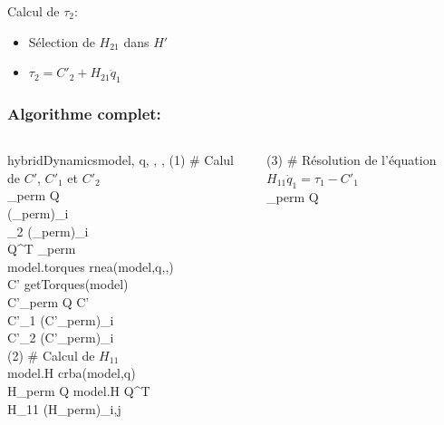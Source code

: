 \documentclass[10pt]{beamer}
\begin{document}
\begin{frame}[allowframebreaks]
	\framebreak
	
	Calcul de $\tau_2$:
	\begin{itemize}
	\item Sélection de $H_{21}$ dans  $H'$
	\item $\tau_2 = C'_2 + H_{21} \ddot{q}_1$
	\end{itemize} \vfill
	
\end{frame}
	
\begin{frame}
	\frametitle{Algorithme complet:}
	  
	\begin{spacing}{1.5}
	\begin{columns}[T]\scriptsize
	\begin{column}{.48\textwidth}
	\begin{pseudocode}{hybridDynamics}{model, q, , , \tau}
	(1)
	\BEGIN
	  \textnormal{\# Calul de $C'$, $C'_1$ et $C'_2$} \\
	  _{perm} \GETS Q  \\
	  (_{perm})_{i \in [1,fd]}  \\
	  _2 \GETS (_{perm})_{i \in [fd+1,n_{dof}]} \\
	   \GETS Q^T _{perm} \\
	  model.torques \GETS rnea(model,q,,) \\
	  C' \GETS getTorques(model) \\
	  C'_{perm} \GETS Q C'\\
	  C'_1 \GETS (C'_{perm})_{i \in [1,fd]} \\
	  C'_2 \GETS (C'_{perm})_{i \in [fd+1,n_{dof}]}
	\END \\
	(2)
	\BEGIN
	  \textnormal{\# Calcul de $H_{11}$} \\
	  model.H \GETS crba(model,q) \\
	  H_{perm} \GETS Q model.H Q^T \\
	  H_{11} \GETS (H_{perm})_{i,j \in [1,fd]} 
	\END 
	\end{pseudocode}
	\end{column}
	\begin{column}{.48\textwidth}
	\begin{pseudocode}{ }{ }
	(3) 
	\BEGIN
	  \textnormal{\# Résolution de l'équation $H_{11} \ddot{q}_1 = \tau_1 - C'_1$} \\
	  \tau_{perm} \GETS Q \tau \\

\end{pseudocode}
\end{column}
\end{columns}
\end{spacing}
\end{frame}
\end{document}
